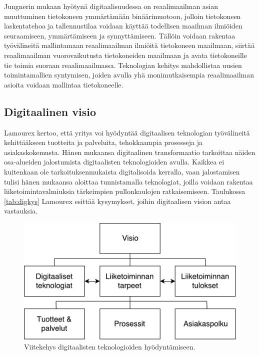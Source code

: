 \documentclass[finnish,12pt,a4paper,pdftex]{article}
\begin{document}
Jungnerin \citeyearpar{jungner} mukaan hyötynä digitaalisuudessa on reaalimaailman asian muuttuminen tietokoneen ymmärtämään binäärimuotoon, jolloin tietokoneen laskentatehoa ja tallennustilaa voidaan käyttää todellisen maailman ilmiöiden seuraamiseen, ymmärtämiseen ja synnyttämiseen. Tällöin voidaan rakentaa työvälineitä mallintamaan reaalimaailman ilmiöitä tietokoneen maailmaan, siirtää reaalimaailman vuorovaikutusta tietokoneiden maailmaan ja avata tietokoneille tie toimia suoraan reaalimaailmassa. Teknologian kehitys mahdollistaa uusien toimintamallien syntymisen, joiden avulla yhä monimutkaisempia reaalimaailman asioita voidaan mallintaa tietokoneelle.

\subsection{Digitaalinen visio}

Lamourex \citeyearpar{lamoureux} kertoo, että yritys voi hyödyntää digitaalisen teknologian työvälineitä kehittääkseen tuotteita ja palveluita, tehokkaampia prosesseja ja asiakaskokemusta. Hänen mukaansa digitaalinen transformaatio tarkoittaa näiden osa-alueiden jalostumista digitaalisten teknologioiden avulla. Kaikkea ei kuitenkaan ole tarkoituksenmukaista digitalisoida kerralla, vaan jalostamisen tulisi hänen mukaansa aloittaa tunnistamalla teknologiat, joilla voidaan rakentaa liiketoimintavalmiuksia tärkeimpien pullonkaulojen ratkaisemiseen. Taulukossa \ref{tab:digkys} Lamourex esittää kysymykset, joihin digitaalisen vision antaa vastauksia.

\begin{figure}[!h]
    \centering
    \includegraphics[scale=0.6]{images/digitaalinenvisio.pdf}
    \caption{Viitekehys digitaalisten teknologioiden hyödyntämiseen. \citep{lamoureux}}
    \label{fig:digivisio}
\end{figure}
\end{document}

